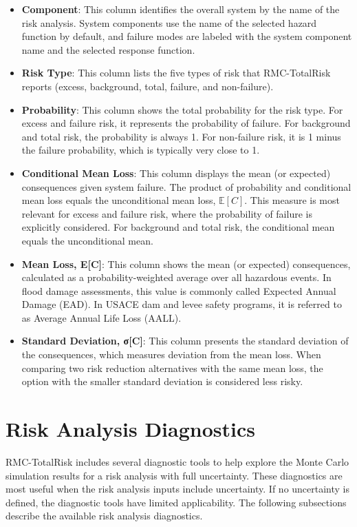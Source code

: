 \documentclass[
]{book}
\begin{document}
\begin{itemize}
\item
  \textbf{Component}: This column identifies the overall system by the name of the risk analysis. System components use the name of the selected hazard function by default, and failure modes are labeled with the system component name and the selected response function.
\item
  \textbf{Risk Type}: This column lists the five types of risk that RMC-TotalRisk reports (excess, background, total, failure, and non-failure).
\item
  \textbf{Probability}: This column shows the total probability for the risk type. For excess and failure risk, it represents the probability of failure. For background and total risk, the probability is always 1. For non-failure risk, it is 1 minus the failure probability, which is typically very close to 1.
\item
  \textbf{Conditional Mean Loss}: This column displays the mean (or expected) consequences given system failure. The product of probability and conditional mean loss equals the unconditional mean loss, \(\mathbb{E}[C]\). This measure is most relevant for excess and failure risk, where the probability of failure is explicitly considered. For background and total risk, the conditional mean equals the unconditional mean.
\item
  \textbf{Mean Loss, Ε{[}C{]}}: This column shows the mean (or expected) consequences, calculated as a probability-weighted average over all hazardous events. In flood damage assessments, this value is commonly called Expected Annual Damage (EAD). In USACE dam and levee safety programs, it is referred to as Average Annual Life Loss (AALL).
\item
  \textbf{Standard Deviation, σ{[}C{]}}: This column presents the standard deviation of the consequences, which measures deviation from the mean loss. When comparing two risk reduction alternatives with the same mean loss, the option with the smaller standard deviation is considered less risky.
\end{itemize}

\hypertarget{risk-analysis-diagnostics}{%
\chapter{Risk Analysis Diagnostics}\label{risk-analysis-diagnostics}}

RMC-TotalRisk includes several diagnostic tools to help explore the Monte Carlo simulation results for a risk analysis with full uncertainty. These diagnostics are most useful when the risk analysis inputs include uncertainty. If no uncertainty is defined, the diagnostic tools have limited applicability. The following subsections describe the available risk analysis diagnostics.
\end{document}
